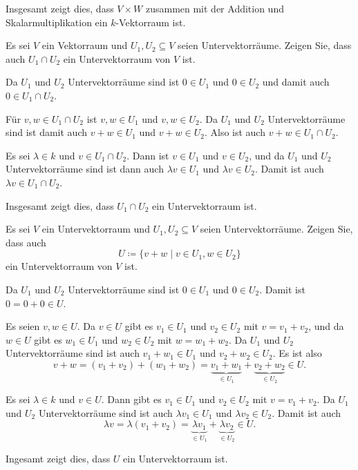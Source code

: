 \begin{solution}
 Insgesamt zeigt dies, dass $V \times W$ zusammen mit der Addition und Skalarmultiplikation ein $k$-Vektorraum ist.
\end{solution}


\begin{question}
 Es sei $V$ ein Vektorraum und $U_1, U_2 \subseteq V$ seien Untervektorräume. Zeigen Sie, dass auch $U_1 \cap U_2$ ein Untervektorraum von $V$ ist.
\end{question}
\begin{solution}
 Da $U_1$ und $U_2$ Untervektorräume sind ist $0 \in U_1$ und $0 \in U_2$ und damit auch $0 \in U_1 \cap U_2$.
 
 Für $v,w \in U_1 \cap U_2$ ist $v,w \in U_1$ und $v,w \in U_2$. Da $U_1$ und $U_2$ Untervektorräume sind ist damit auch $v+w \in U_1$ und $v+w \in U_2$. Also ist auch $v+w \in U_1 \cap U_2$.
 
 Es sei $\lambda \in k$ und $v \in U_1 \cap U_2$. Dann ist $v \in U_1$ und $v \in U_2$, und da $U_1$ und $U_2$ Untervektorräume sind ist dann auch $\lambda v \in U_1$ und $\lambda v \in U_2$. Damit ist auch $\lambda v \in U_1 \cap U_2$.
 
 Insgesamt zeigt dies, dass $U_1 \cap U_2$ ein Untervektorraum ist.
\end{solution}


\begin{question}
 Es sei $V$ ein Untervektorraum und $U_1, U_2 \subseteq V$ seien Untervektorräume. Zeigen Sie, dass auch
 \[
  U \coloneqq \{v + w \mid v \in U_1, w \in U_2\}
 \]
 ein Untervektorraum von $V$ ist.
\end{question}
\begin{solution}
 Da $U_1$ und $U_2$ Untervektorräume sind ist $0 \in U_1$ und $0 \in U_2$. Damit ist $0 = 0 + 0 \in U$.
 
 Es seien $v, w \in U$. Da $v \in U$ gibt es $v_1 \in U_1$ und $v_2 \in U_2$ mit $v = v_1 + v_2$, und da $w \in U$ gibt es $w_1 \in U_1$ und $w_2 \in U_2$ mit $w = w_1 + w_2$. Da $U_1$ und $U_2$ Untervektorräume sind ist auch $v_1 + w_1 \in U_1$ und $v_2 + w_2 \in U_2$. Es ist also
 \[
  v + w
  = (v_1 + v_2) + (w_1 + w_2)
  = \underbrace{v_1 + w_1}_{\in U_1} + \underbrace{v_2 + w_2}_{\in U_2}
  \in U.
 \]
 
 Es sei $\lambda \in k$ und $v \in U$. Dann gibt es $v_1 \in U_1$ und $v_2 \in U_2$ mit $v = v_1 + v_2$. Da $U_1$ und $U_2$ Untervektorräume sind ist auch $\lambda v_1 \in U_1$ und $\lambda v_2 \in U_2$. Damit ist auch
 \[
  \lambda v
  = \lambda (v_1 + v_2)
  = \underbrace{\lambda v_1}_{\in U_1} + \underbrace{\lambda v_2}_{\in U_2}
  \in U.
 \]
 
 Ingesamt zeigt dies, dass $U$ ein Untervektorraum ist.
\end{solution}


